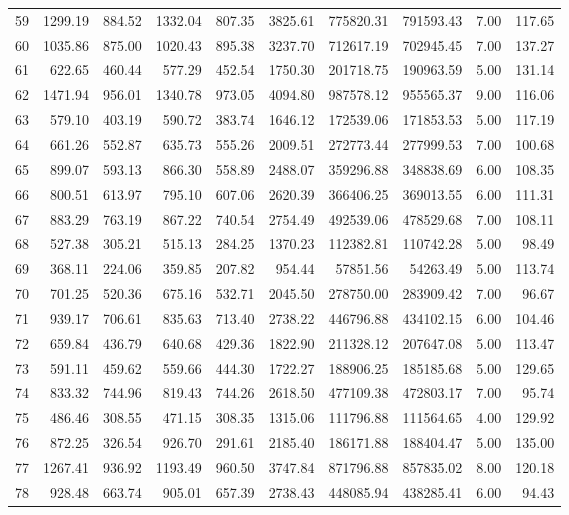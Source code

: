 \begin{tabular}{lrrrrrrrrr}
59 & 1299.19 & 884.52 & 1332.04 & 807.35 & 3825.61 & 775820.31 & 791593.43 & 7.00 & 117.65 \\
60 & 1035.86 & 875.00 & 1020.43 & 895.38 & 3237.70 & 712617.19 & 702945.45 & 7.00 & 137.27 \\
61 & 622.65 & 460.44 & 577.29 & 452.54 & 1750.30 & 201718.75 & 190963.59 & 5.00 & 131.14 \\
62 & 1471.94 & 956.01 & 1340.78 & 973.05 & 4094.80 & 987578.12 & 955565.37 & 9.00 & 116.06 \\
63 & 579.10 & 403.19 & 590.72 & 383.74 & 1646.12 & 172539.06 & 171853.53 & 5.00 & 117.19 \\
64 & 661.26 & 552.87 & 635.73 & 555.26 & 2009.51 & 272773.44 & 277999.53 & 7.00 & 100.68 \\
65 & 899.07 & 593.13 & 866.30 & 558.89 & 2488.07 & 359296.88 & 348838.69 & 6.00 & 108.35 \\
66 & 800.51 & 613.97 & 795.10 & 607.06 & 2620.39 & 366406.25 & 369013.55 & 6.00 & 111.31 \\
67 & 883.29 & 763.19 & 867.22 & 740.54 & 2754.49 & 492539.06 & 478529.68 & 7.00 & 108.11 \\
68 & 527.38 & 305.21 & 515.13 & 284.25 & 1370.23 & 112382.81 & 110742.28 & 5.00 & 98.49 \\
69 & 368.11 & 224.06 & 359.85 & 207.82 & 954.44 & 57851.56 & 54263.49 & 5.00 & 113.74 \\
70 & 701.25 & 520.36 & 675.16 & 532.71 & 2045.50 & 278750.00 & 283909.42 & 7.00 & 96.67 \\
71 & 939.17 & 706.61 & 835.63 & 713.40 & 2738.22 & 446796.88 & 434102.15 & 6.00 & 104.46 \\
72 & 659.84 & 436.79 & 640.68 & 429.36 & 1822.90 & 211328.12 & 207647.08 & 5.00 & 113.47 \\
73 & 591.11 & 459.62 & 559.66 & 444.30 & 1722.27 & 188906.25 & 185185.68 & 5.00 & 129.65 \\
74 & 833.32 & 744.96 & 819.43 & 744.26 & 2618.50 & 477109.38 & 472803.17 & 7.00 & 95.74 \\
75 & 486.46 & 308.55 & 471.15 & 308.35 & 1315.06 & 111796.88 & 111564.65 & 4.00 & 129.92 \\
76 & 872.25 & 326.54 & 926.70 & 291.61 & 2185.40 & 186171.88 & 188404.47 & 5.00 & 135.00 \\
77 & 1267.41 & 936.92 & 1193.49 & 960.50 & 3747.84 & 871796.88 & 857835.02 & 8.00 & 120.18 \\
78 & 928.48 & 663.74 & 905.01 & 657.39 & 2738.43 & 448085.94 & 438285.41 & 6.00 & 94.43 \\

\end{tabular}
